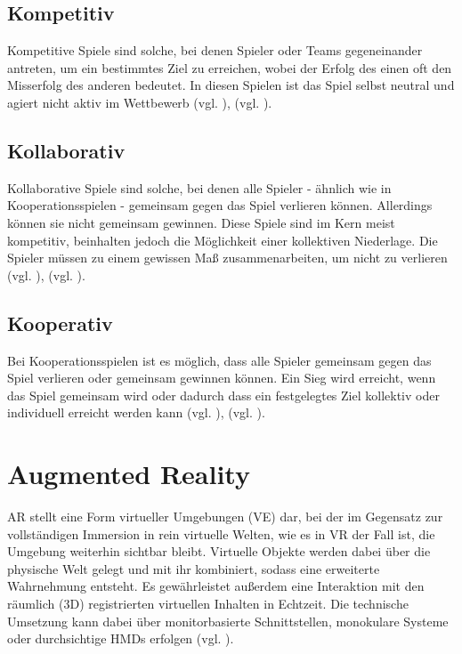 \subsection{Kompetitiv}
Kompetitive Spiele sind solche, bei denen Spieler oder Teams gegeneinander antreten, um ein bestimmtes Ziel zu erreichen, wobei der Erfolg des einen oft den Misserfolg des anderen bedeutet. In diesen Spielen ist das Spiel selbst neutral und agiert nicht aktiv im Wettbewerb (vgl. \cite{noauthor_game_2014}), (vgl. \cite[S. 25]{zagal_collaborative_2006}).

\subsection{Kollaborativ}
Kollaborative Spiele sind solche, bei denen alle Spieler - ähnlich wie in Kooperationsspielen - gemeinsam gegen das Spiel verlieren können. Allerdings können sie nicht gemeinsam gewinnen. Diese Spiele sind im Kern meist kompetitiv, beinhalten jedoch die Möglichkeit einer kollektiven Niederlage. Die Spieler müssen zu einem gewissen Maß zusammenarbeiten, um nicht zu verlieren (vgl. \cite{noauthor_game_2014}), (vgl. \cite[S. 25]{zagal_collaborative_2006}).

\subsection{Kooperativ}
Bei Kooperationsspielen ist es möglich, dass alle Spieler gemeinsam gegen das Spiel verlieren oder gemeinsam gewinnen können. Ein Sieg wird erreicht, wenn das Spiel gemeinsam  wird oder dadurch dass ein festgelegtes Ziel kollektiv oder individuell erreicht werden kann (vgl. \cite{noauthor_game_2014}), (vgl. \cite[S. 25]{zagal_collaborative_2006}).

\section{Augmented Reality}

\ac{AR} stellt eine Form virtueller Umgebungen (\ac{VE}) dar, bei der im Gegensatz zur vollständigen Immersion in rein virtuelle Welten, wie es in \ac{VR} der Fall ist, die Umgebung weiterhin sichtbar bleibt. Virtuelle Objekte werden dabei über die physische Welt gelegt und mit ihr kombiniert, sodass eine erweiterte Wahrnehmung entsteht. Es gewährleistet außerdem eine Interaktion mit den räumlich (\ac{3D}) registrierten virtuellen Inhalten in Echtzeit. Die technische Umsetzung kann dabei über monitorbasierte Schnittstellen, monokulare Systeme oder durchsichtige \ac{HMD}s erfolgen (vgl. \cite[S. 2f]{azuma_survey_1997}).



